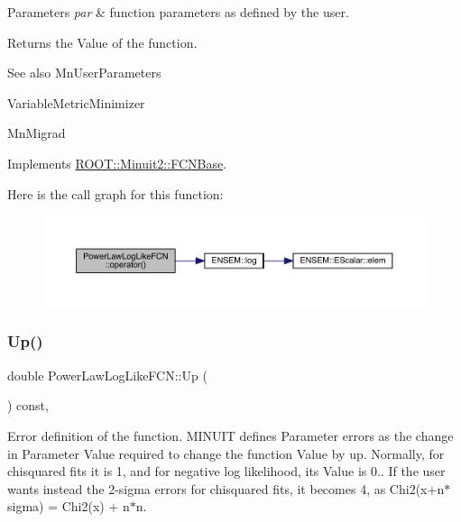 \begin{DoxyParams}{Parameters}
{\em par} & function parameters as defined by the user.\\
\hline
\end{DoxyParams}
\begin{DoxyReturn}{Returns}
the Value of the function.
\end{DoxyReturn}
\begin{DoxySeeAlso}{See also}
Mn\+User\+Parameters 

Variable\+Metric\+Minimizer 

Mn\+Migrad 
\end{DoxySeeAlso}


Implements \mbox{\hyperlink{classROOT_1_1Minuit2_1_1FCNBase_ae4a86bd94d0d0f5ca6fc8f8ab2bb43cd}{R\+O\+O\+T\+::\+Minuit2\+::\+F\+C\+N\+Base}}.

Here is the call graph for this function\+:
\nopagebreak
\begin{figure}[H]
\begin{center}
\leavevmode
\includegraphics[width=350pt]{dc/d0f/classPowerLawLogLikeFCN_a279b7010b6b252d0772e5d561f749386_cgraph}
\end{center}
\end{figure}
\mbox{\label{classPowerLawLogLikeFCN_ae1700e7288ed461d0e3354a2f2c5ea6a}} 
\subsubsection{\texorpdfstring{Up()}{Up()}\hspace{0.1cm}{\footnotesize\ttfamily [1/2]}}
{\footnotesize\ttfamily double Power\+Law\+Log\+Like\+F\+C\+N\+::\+Up (\begin{DoxyParamCaption}{ }\end{DoxyParamCaption}) const\hspace{0.3cm}{\ttfamily [inline]}, {\ttfamily [virtual]}}

Error definition of the function. M\+I\+N\+U\+IT defines Parameter errors as the change in Parameter Value required to change the function Value by up. Normally, for chisquared fits it is 1, and for negative log likelihood, its Value is 0.. If the user wants instead the 2-\/sigma errors for chisquared fits, it becomes 4, as Chi2(x+n$\ast$sigma) = Chi2(x) + n$\ast$n.

